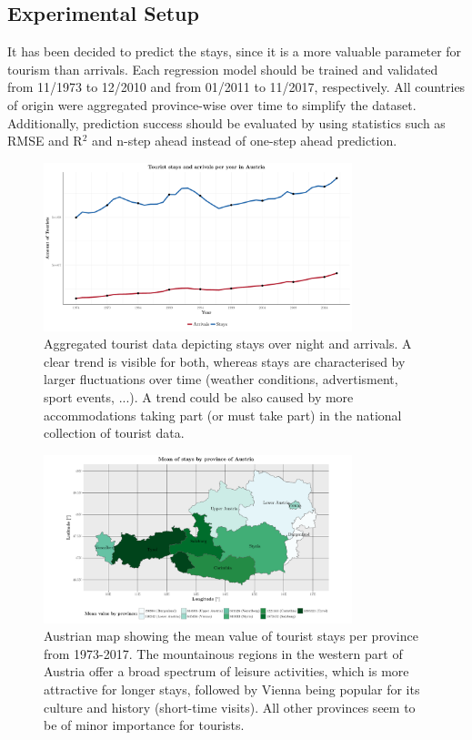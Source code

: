 \documentclass[a4paper,reqno,]{article}
\begin{document}
\subsection{Experimental Setup}
\label{ssec:exp_setup}
It has been decided to predict the stays, since it is a more valuable parameter for tourism than arrivals. Each regression model should be trained and validated from 11/1973 to 12/2010 and from 01/2011 to 11/2017, respectively. All countries of origin were aggregated province-wise over time to simplify the dataset. Additionally, prediction success should be evaluated by using statistics such as RMSE and R$^2$ and n-step ahead instead of one-step ahead prediction.
\newpage
\begin{figure}[h!]
\begin{minipage}[b]{1\textwidth}
\centering
    \includegraphics[width=0.8\textwidth]{images/EA/tourist_stays_summary.pdf}
    \caption{Aggregated tourist data depicting stays over night and arrivals. A clear trend is visible for both, whereas stays are characterised by larger fluctuations over time (weather conditions, advertisment, sport events, ...). A trend could be also caused by more accommodations taking part (or must take part) in the national collection of tourist data.}
\label{fig:tourist_stays_summary}
\end{minipage}
\end{figure} 
\begin{figure}[h!]
\begin{minipage}[b]{1\textwidth}
\centering
    \includegraphics[width=0.8\textwidth]{images/EA/provinces_stays_mean.pdf}
    \caption{Austrian map showing the mean value of tourist stays per province from 1973-2017. The mountainous regions in the western part of Austria offer a broad spectrum of leisure activities, which is more attractive for longer stays, followed by Vienna being popular for its culture and history (short-time visits). All other provinces seem to be of minor importance for tourists.}
       \label{fig:tourist_stays_map}
\end{minipage}
\end{figure} 
\newpage
\end{document}
